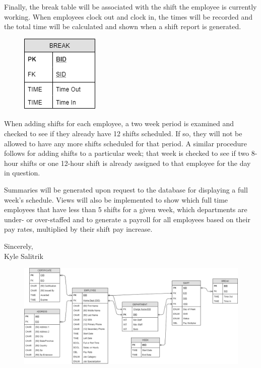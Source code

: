 \documentclass[letter,12pt]{texMemo}
\begin{document}
Finally, the break table will be associated with the shift the employee is currently working. When employees clock out and clock in, the times will be recorded and the total time will be calculated and shown when a shift report is generated.
\begin{figure}[H]
	\centering
	\includegraphics[scale=.6]{break.png}
\end{figure}

\newpage

When adding shifts for each employee, a two week period is examined and checked to see if they already have 12 shifts scheduled. If so, they will not be allowed to have any more shifts scheduled for that period. A similar procedure follows for adding shifts to a particular week; that week is checked to see if two 8-hour shifts or one 12-hour shift is already assigned to that employee for the day in question.

Summaries will be generated upon request to the database for displaying a full week's schedule. Views will also be implemented to show which full time employees that have less than 5 shifts for a given week, which departments are under- or over-staffed and to generate a payroll for all employees based on their pay rates, multiplied by their shift pay increase.

\bigskip{}\decorativeline\bigskip{}

Sincerely,\\

\quad Kyle Salitrik

\newpage
\begin{figure}[H]
	\centering
	\includegraphics[angle=90, height=\textheight]{er_diag.png}
\end{figure}
\end{document}
